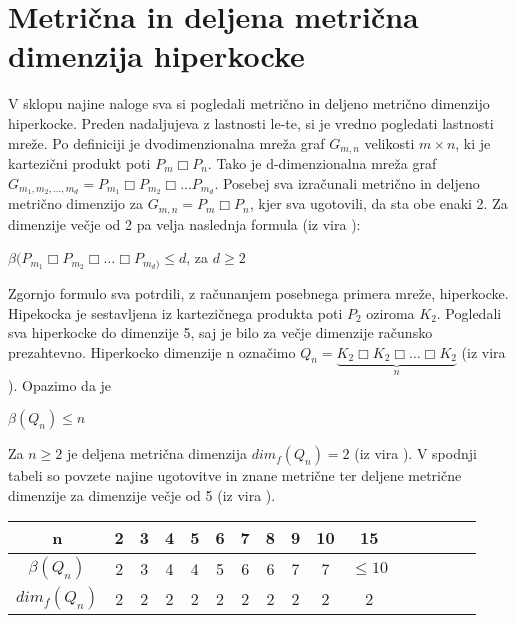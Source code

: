 \documentclass[a4paper]{report}
\begin{document}
	\section*{Metrična in deljena metrična dimenzija hiperkocke}
	V sklopu najine naloge sva si pogledali metrično in deljeno metrično dimenzijo hiperkocke. Preden nadaljujeva z lastnosti le-te, si je vredno pogledati lastnosti mreže.
	Po definiciji je dvodimenzionalna mreža graf $G_{m,n}$ velikosti $m\times n$, ki je kartezični produkt poti $P_{m}\Box P_{n}$. Tako je d-dimenzionalna mreža graf $G_{m_{1},m_{2},\dots,m_{d}} = P_{m_{1}}\Box P_{m_{2}}\Box \dots P_{m_{d}}$. Posebej sva izračunali metrično in deljeno metrično dimenzijo za  $G_{m,n}=P_{m}\Box P_{n}$, kjer sva ugotovili, da sta obe enaki 2. Za dimenzije večje od 2 pa velja naslednja formula (iz vira \cite{3}): \\
	\begin{center}
		$\beta(P_{m_{1}}\Box P_{m_{2}}\Box \dots \Box P_{m_{d})} \le d$, za $d\ge 2$
	\end{center}
	Zgornjo formulo sva potrdili, z računanjem posebnega primera mreže, hiperkocke. Hipekocka je sestavljena iz kartezičnega produkta poti $P_{2}$ oziroma $K_{2}$. Pogledali sva hiperkocke do dimenzije 5, saj je bilo za večje dimenzije računsko prezahtevno. Hiperkocko dimenzije n označimo $Q_{n} = \underbrace{K_{2} \Box K_{2}\Box \dots \Box K_{2}}_{n}$ (iz vira \cite{4}). Opazimo da je
	\begin{center}
		$\beta(Q_{n})\le n$
	\end{center}
	Za $n \ge 2$ je deljena metrična dimenzija $dim_{f}(Q_{n}) = 2$ (iz vira \cite{2}). 
	V spodnji tabeli so povzete najine ugotovitve in znane metrične ter deljene metrične dimenzije za dimenzije večje od 5 (iz vira \cite{3}).
	
	
	\begin{center}
		\begin{tabular}{|c||c|c|c|c|c|c|c|c|c|c|c|c|c|c|c}
			\hline
			\hline
			n&2&3&4&5&6&7&8&9&10&15\\
			\hline
			$\beta(Q_{n})$&2&3&4&4&5&6&6&7&7& $\le 10$ \\
			\hline
			$dim_{f}(Q_{n})$&2&2&2&2&2&2&2&2&2&2\\
			\hline
			\hline
		\end{tabular}
	\end{center}
\end{document}
